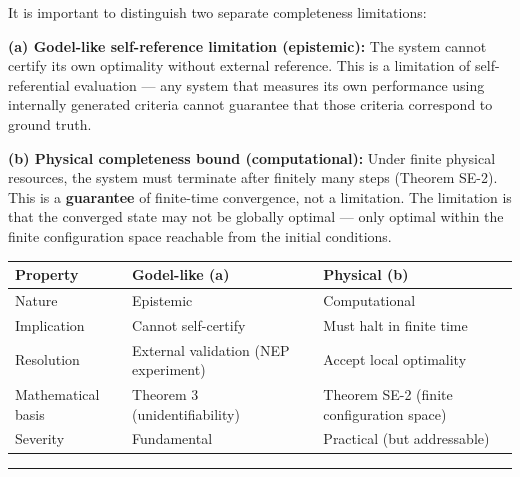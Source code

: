 \documentclass[
  12pt,
]{article}
\begin{document}
It is important to distinguish two separate completeness limitations:

\textbf{(a) Godel-like self-reference limitation (epistemic):} The
system cannot certify its own optimality without external reference.
This is a limitation of self-referential evaluation --- any system that
measures its own performance using internally generated criteria cannot
guarantee that those criteria correspond to ground truth.

\textbf{(b) Physical completeness bound (computational):} Under finite
physical resources, the system must terminate after finitely many steps
(Theorem SE-2). This is a \textbf{guarantee} of finite-time convergence,
not a limitation. The limitation is that the converged state may not be
globally optimal --- only optimal within the finite configuration space
reachable from the initial conditions.

\begin{longtable}[]{@{}
  >{\raggedright\arraybackslash}p{}
  >{\raggedright\arraybackslash}p{}
  >{\raggedright\arraybackslash}p{}@{}}
\toprule\noalign{}
\begin{minipage}[b]{\linewidth}\raggedright
Property
\end{minipage} & \begin{minipage}[b]{\linewidth}\raggedright
Godel-like (a)
\end{minipage} & \begin{minipage}[b]{\linewidth}\raggedright
Physical (b)
\end{minipage} \\
\midrule\noalign{}
\endhead
\bottomrule\noalign{}
\endlastfoot
Nature & Epistemic & Computational \\
Implication & Cannot self-certify & Must halt in finite time \\
Resolution & External validation (NEP experiment) & Accept local
optimality \\
Mathematical basis & Theorem 3 (unidentifiability) & Theorem SE-2
(finite configuration space) \\
Severity & Fundamental & Practical (but addressable) \\
\end{longtable}

\begin{center}\rule{0.5\linewidth}{0.5pt}\end{center}
\end{document}
